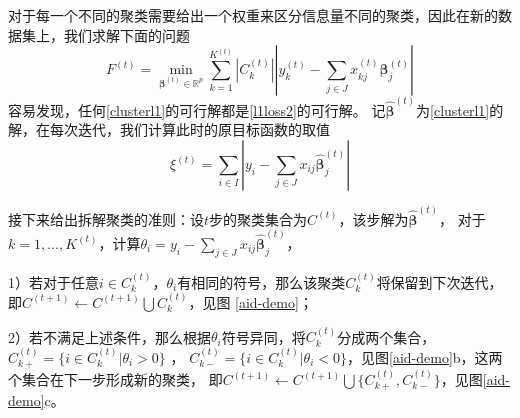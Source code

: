 对于每一个不同的聚类需要给出一个权重来区分信息量不同的聚类，因此在新的数据集上，我们求解下面的问题
\begin{equation}\label{clusterl1}
    F^{(t)} =\underset{\bm{\beta}^{(t)} \in \mathbb{R}^{p}}{\operatorname{min}} 
    \sum_{k=1}^{K^{(t)}}|C_k^{(t)}||y_k^{(t)} - \sum_{j \in J}x_{kj}^{(t)}\bm{\beta}_j^{(t)}|
\end{equation}
容易发现，任何\eqref{clusterl1}的可行解都是\eqref{l1loss2}的可行解。
记$\hat{\bm{\beta}}^{(t)}$为\eqref{clusterl1}的解，在每次迭代，我们计算此时的原目标函数的取值
\begin{equation}
    \xi^{(t)} = \sum_{i \in I} |y_i - \sum_{j \in J}x_{ij}\hat{\bm{\beta}}_j^{(t)}|
\end{equation}

接下来给出拆解聚类的准则：设$t$步的聚类集合为$C^{(t)}$，该步解为$\hat{\bm{\beta}}^{(t)}$，
对于$k = 1, ..., K^{(t)}$，计算$\theta_i = y_i - \sum_{j \in J}x_{ij}\hat{\bm{\beta}}_j^{(t)}$，

1）若对于任意$i \in C_k^{(t)}$，$\theta_i$有相同的符号，那么该聚类$C^{(t)}_k$将保留到下次迭代，即$C^{(t+1)} \leftarrow C^{(t+1)}\bigcup C^{(t)}_k$，见图
\ref{aid-demo}；

2）若不满足上述条件，那么根据$\theta_i$符号异同，将$C^{(t)}_k$分成两个集合，$C_{k+}^{(t)} = \{i \in C_k^{(t)} | \theta_i > 0\}$ ，
$C_{k-}^{(t)} = \{i \in C_k^{(t)} | \theta_i < 0\}$，见图\ref{aid-demo}b，这两个集合在下一步形成新的聚类，
即$C^{(t+1)} \leftarrow C^{(t+1)}\bigcup \{ C_{k+}^{(t)}, C_{k-}^{(t)}\}$，见图\ref{aid-demo}c。

